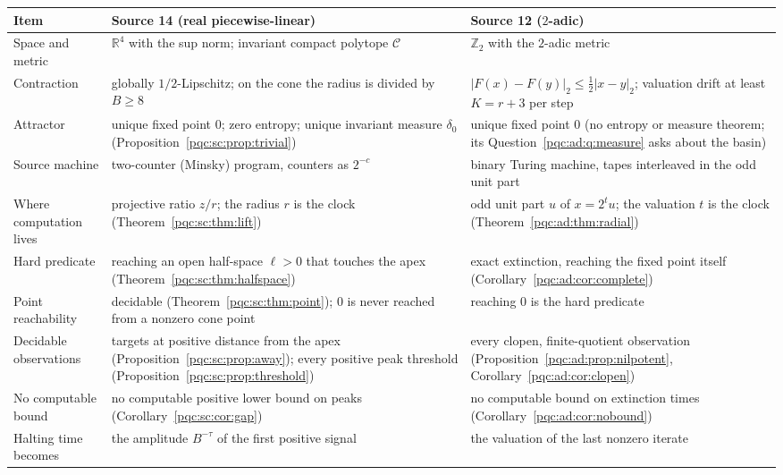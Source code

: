 \documentclass[11pt,letterpaper]{article}
\numberwithin{equation}{section}
\theoremstyle{definition}
\theoremstyle{remark}
\newcommand{\R}{\mathbb R}
\newcommand{\Ztwo}{\mathbb Z_2}
\newcommand{\Cone}{\mathcal C}
\begin{document}
\begin{center}
\small
\begin{tabularx}{\textwidth}{@{}>{\raggedright\arraybackslash}p{}>{\raggedright\arraybackslash}X>{\raggedright\arraybackslash}X@{}}
\toprule
Item & Source 14 (real piecewise-linear) & Source 12 ($2$-adic)\\
\midrule
Space and metric & $\R^4$ with the sup norm; invariant compact polytope $\Cone$ & $\Ztwo$ with the $2$-adic metric\\
Contraction & globally $1/2$-Lipschitz; on the cone the radius is divided by $B\ge8$ & $|F(x)-F(y)|_2\le\frac12|x-y|_2$; valuation drift at least $K=r+3$ per step\\
Attractor & unique fixed point $0$; zero entropy; unique invariant measure $\delta_0$ (Proposition~\ref{pqc:sc:prop:trivial}) & unique fixed point $0$ (no entropy or measure theorem; its Question~\ref{pqc:ad:q:measure} asks about the basin)\\
Source machine & two-counter (Minsky) program, counters as $2^{-c}$ & binary Turing machine, tapes interleaved in the odd unit part\\
Where computation lives & projective ratio $z/r$; the radius $r$ is the clock (Theorem~\ref{pqc:sc:thm:lift}) & odd unit part $u$ of $x=2^tu$; the valuation $t$ is the clock (Theorem~\ref{pqc:ad:thm:radial})\\
Hard predicate & reaching an open half-space $\ell>0$ that touches the apex (Theorem~\ref{pqc:sc:thm:halfspace}) & exact extinction, reaching the fixed point itself (Corollary~\ref{pqc:ad:cor:complete})\\
Point reachability & decidable (Theorem~\ref{pqc:sc:thm:point}); $0$ is never reached from a nonzero cone point & reaching $0$ is the hard predicate\\
Decidable observations & targets at positive distance from the apex (Proposition~\ref{pqc:sc:prop:away}); every positive peak threshold (Proposition~\ref{pqc:sc:prop:threshold}) & every clopen, finite-quotient observation (Proposition~\ref{pqc:ad:prop:nilpotent}, Corollary~\ref{pqc:ad:cor:clopen})\\
No computable bound & no computable positive lower bound on peaks (Corollary~\ref{pqc:sc:cor:gap}) & no computable bound on extinction times (Corollary~\ref{pqc:ad:cor:nobound})\\
Halting time becomes & the amplitude $B^{-\tau}$ of the first positive signal & the valuation of the last nonzero iterate\\

\end{tabularx}
\end{center}
\end{document}
